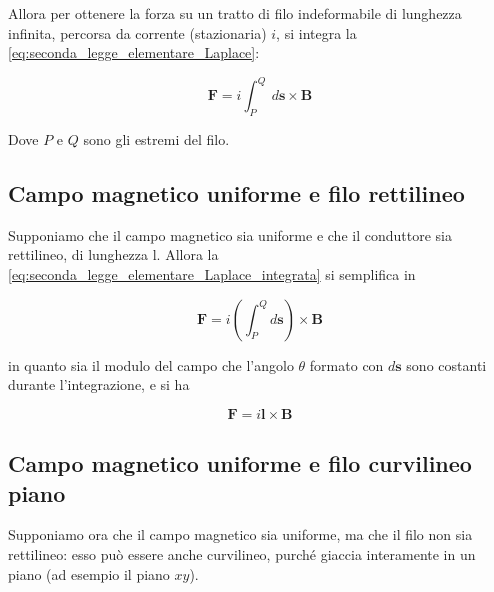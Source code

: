 Allora per ottenere la forza su un tratto di filo indeformabile di lunghezza infinita, percorsa da corrente (stazionaria) $i$, si integra la \ref{eq:seconda_legge_elementare_Laplace}:

\begin{tcolorbox}[colback=yellow!10!white, colframe=orange!70!black, boxrule=0.8pt]
\begin{equation} \label{eq:seconda_legge_elementare_Laplace_integrata}
    \mathbf{F} = i \int_{P}^{Q}\ d \mathbf{s} \times \mathbf{B}
\end{equation}
\end{tcolorbox}

Dove $P$ e $Q$ sono gli estremi del filo. \\

\subsection{Campo magnetico uniforme e filo rettilineo}

Supponiamo che il campo magnetico sia uniforme e che il conduttore sia rettilineo, di lunghezza l. Allora la \ref{eq:seconda_legge_elementare_Laplace_integrata} si semplifica in

\begin{equation*}
    \mathbf{F} = i \left( \int_{P}^{Q} d \mathbf{s} \right) \times \mathbf{B}
\end{equation*}

in quanto sia il modulo del campo che l'angolo $\theta$ formato con $d \mathbf{s}$ sono costanti durante l'integrazione, e si ha 

\begin{tcolorbox}[colback=yellow!10!white, colframe=orange!70!black, boxrule=0.8pt]
\begin{equation} 
     \mathbf{F} = i \mathbf{l} \times \mathbf{B}
\end{equation}
\end{tcolorbox}

\subsection{ Campo magnetico uniforme e filo curvilineo piano}

Supponiamo ora che il campo magnetico sia uniforme, ma che il filo non sia rettilineo: esso può essere anche curvilineo, purché giaccia interamente in un piano (ad esempio il piano $xy$). \\

